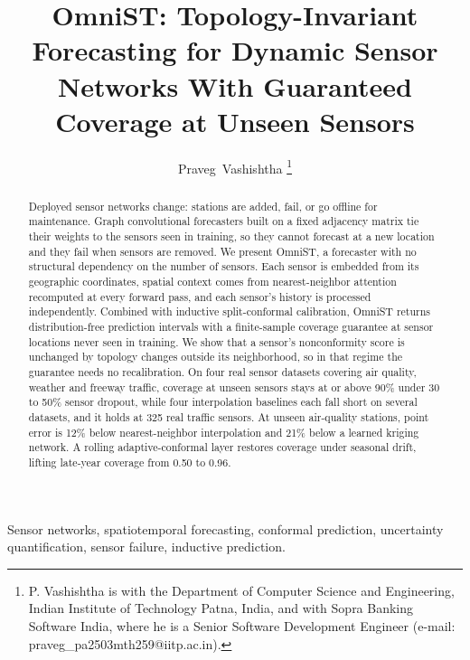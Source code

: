 \documentclass[journal]{IEEEtran}
\begin{document}
\title{OmniST: Topology-Invariant Forecasting for Dynamic Sensor Networks With Guaranteed Coverage
at Unseen Sensors}

\author{Praveg~Vashishtha
\thanks{P. Vashishtha is with the Department of Computer Science and Engineering, Indian Institute
of Technology Patna, India, and with Sopra Banking Software India, where he is a Senior Software
Development Engineer (e-mail: praveg\_pa2503mth259@iitp.ac.in).}}

\maketitle

\begin{abstract}
Deployed sensor networks change: stations are added, fail, or go offline for maintenance. Graph
convolutional forecasters built on a fixed adjacency matrix tie their weights to the sensors seen in
training, so they cannot forecast at a new location and they fail when sensors are removed. We
present OmniST, a forecaster with no structural dependency on the number of sensors. Each sensor is
embedded from its geographic coordinates, spatial context comes from nearest-neighbor attention
recomputed at every forward pass, and each sensor's history is processed independently. Combined with
inductive split-conformal calibration, OmniST returns distribution-free prediction intervals with a
finite-sample coverage guarantee at sensor locations never seen in training. We show that a sensor's
nonconformity score is unchanged by topology changes outside its neighborhood, so in that regime the
guarantee needs no recalibration. On four real sensor datasets covering air quality, weather and
freeway traffic, coverage at unseen sensors stays at or above 90\% under 30 to 50\% sensor dropout,
while four interpolation baselines each fall short on several datasets, and it holds at 325 real
traffic sensors. At unseen air-quality stations, point error is 12\% below nearest-neighbor
interpolation and 21\% below a learned kriging network. A rolling adaptive-conformal layer restores
coverage under seasonal drift, lifting late-year coverage from 0.50 to 0.96.
\end{abstract}

\begin{IEEEkeywords}
Sensor networks, spatiotemporal forecasting, conformal prediction, uncertainty quantification,
sensor failure, inductive prediction.
\end{IEEEkeywords}
\end{document}
